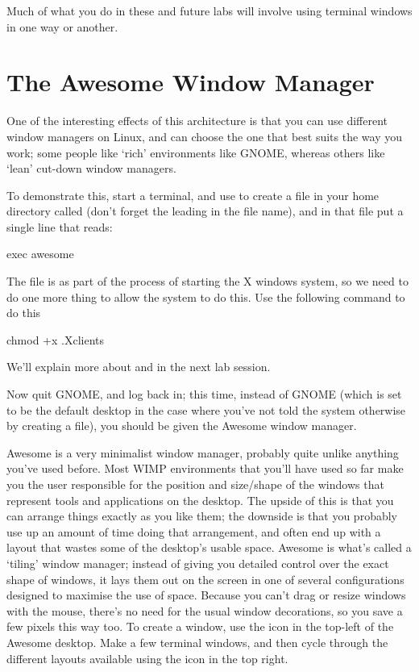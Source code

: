 Much of what you do in these and future labs will involve using terminal windows in one way or another.



\section{The Awesome Window Manager} 
One of the interesting effects of this architecture is that you can use different window managers on Linux, and can choose the one that best suits the way you work; some people like `rich' environments like GNOME, whereas others like `lean' cut-down window managers. 

To demonstrate this, start a terminal, and use  to create a file in your home directory called  (don't forget the leading  in the file name), and in that file put a single line that reads:

\begin{ttoutenv} 
exec awesome
\end{ttoutenv}
 
The file  is  as part of the process of starting the X windows system, so we need to do one more thing to allow the system to do this. Use the following command to do this
\begin{ttoutenv}
chmod +x .Xclients
\end{ttoutenv}
We'll explain more about  and  in the next lab session.

Now quit GNOME, and log back in; this time, instead of GNOME (which is set to be the default desktop in the case where you've not told the system otherwise by creating a  file), you should be given the Awesome window manager.

Awesome is a very minimalist window manager, probably quite unlike anything you've used before. Most WIMP environments that you'll have used so far make you the user responsible for the position and size/shape of the windows that represent tools and applications on the desktop. The upside of this is that you can arrange things exactly as you like them; the downside is that you probably use up an amount of time doing that arrangement, and often end up with a layout that wastes some of the desktop's usable space. Awesome is what's called a `tiling' window manager; instead of giving you detailed control over the exact shape of windows, it lays them out on the screen in one of several configurations designed to maximise the use of space. Because you can't drag or resize windows with the mouse, there's no need for the usual window decorations, so you save a few pixels this way too. To create a window, use the icon in the top-left of the Awesome desktop. Make a few terminal windows, and then cycle through the different layouts available using the icon in the top right. 

